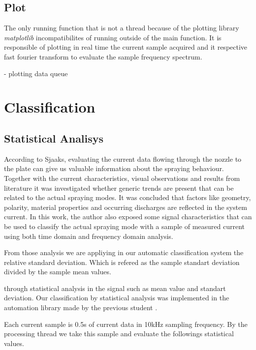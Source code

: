     \subsection{Plot}

        The only running function that is not a thread because of the plotting library \emph{matplotlib} incompatibilites of running outside of the main function. 
        It is responsible of plotting in real time the current sample acquired and it respective fast fourier transform to evaluate the sample frequency spectrum.



    
    
    - plotting data queue


\section{Classification}
\label{sec:section_classification}

\subsection{Statistical Analisys}

 According to Sjaaks\cite{Sjaaks}, evaluating the current data flowing through the nozzle to the plate can give us valuable information about the spraying behaviour.
 Together with the current characteristics, visual observations and results from literature it was investigated whether generic trends are present that can be related to the actual spraying modes.
 It was concluded that factors like geometry, polarity, material properties and occurring discharges are reflected in the system current.
In this work, the author also exposed some signal characteristics that can be used to classify the actual spraying mode with a sample of measured current using both time domain and frequency domain analysis.

From those analysis we are appliying in our automatic classification system the relative standard deviation. Which is refered as the sample standart deviation divided by the sample mean values.
 
 through statistical analysis in the signal such as mean value and standart deviation.
 Our classification by statistical analysis was implemented in the automation library made by the previous student \cite{Monica}.

 Each current sample is 0.5s of current data in 10kHz sampling frequency.
 By the processing thread we take this sample and evaluate the followings statistical values.
        
